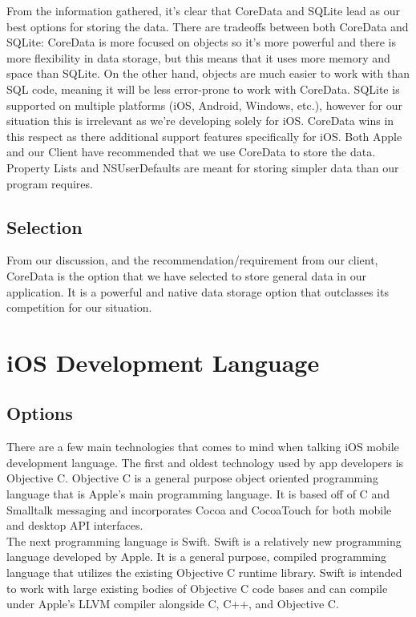\documentclass[letterpaper,10pt,titlepage]{article}
\begin{document}
From the information gathered, it's clear that CoreData and SQLite lead as our best options for storing the data. There are tradeoffs between both CoreData and SQLite: CoreData is more focused on objects so it's more powerful and there is more flexibility in data storage, but this means that it uses more memory and space than SQLite. On the other hand, objects are much easier to work with than SQL code, meaning it will be less error-prone to work with CoreData. SQLite is supported on multiple platforms (iOS, Android, Windows, etc.), however for our situation this is irrelevant as we're developing solely for iOS. CoreData wins in this respect as there additional support features specifically for iOS. Both Apple and our Client have recommended that we use CoreData to store the data. Property Lists and NSUserDefaults are meant for storing simpler data than our program requires.

\subsection{Selection}

From our discussion, and the recommendation/requirement from our client, CoreData is the option that we have selected to store general data in our application. It is a powerful and native data storage option that outclasses its competition for our situation.

\section{iOS Development Language}

\subsection{Options}

There are a few main technologies that comes to mind when talking iOS mobile development language. The first and oldest technology used by app developers is Objective C. Objective C is a general purpose object oriented programming language that is Apple's main programming language. It is based off of C and Smalltalk messaging and incorporates Cocoa and CocoaTouch for both mobile and desktop API interfaces.\\

The next programming language is Swift. Swift is a relatively new programming language developed by Apple. It is a general purpose, compiled programming language that utilizes the existing Objective C runtime library.\cite{Language} Swift is intended to work with large existing bodies of Objective C code bases and can compile under Apple's LLVM compiler alongside C, C++, and Objective C.\\
\end{document}

